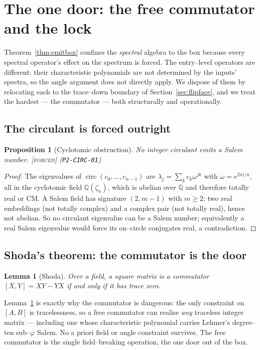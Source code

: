 \documentclass[11pt]{article}
\theoremstyle{plain}
\newtheorem{proposition}[theorem]{Proposition}
\newtheorem{lemma}[theorem]{Lemma}
\theoremstyle{definition}
\theoremstyle{remark}
\newcommand{\forced}{\textcolor{forcedc}{\textsc{[forced]}}}
\newcommand{\Q}{\mathbb{Q}}
\begin{document}
\section{The one door: the free commutator and the lock}\label{sec:door}

Theorem~\ref{thm:emitbox} confines the \emph{spectral} algebra to the box because every spectral operator's effect on the spectrum is forced. The entry--level operators are different: their characteristic polynomials are not determined by the inputs' spectra, so the angle argument does not directly apply. We dispose of them by relocating each to the trace--down boundary of Section~\ref{sec:flipface}, and we treat the hardest --- the commutator --- both structurally and operationally.

\subsection{The circulant is forced outright}
\begin{proposition}[Cyclotomic obstruction]\label{prop:circ}
No integer circulant emits a Salem number. \forced{} {\small(\texttt{P2-CIRC-01})}
\end{proposition}
\begin{proof}
The eigenvalues of $\operatorname{circ}(c_0,\dots,c_{n-1})$ are $\lambda_j=\sum_k c_k\omega^{jk}$ with $\omega=e^{2\pi i/n}$, all in the cyclotomic field $\Q(\zeta_n)$, which is abelian over $\Q$ and therefore totally real or CM. A Salem field has signature $(2,m-1)$ with $m\ge2$: two real embeddings (not totally complex) and a complex pair (not totally real), hence not abelian. So no circulant eigenvalue can be a Salem number; equivalently a real Salem eigenvalue would force its on--circle conjugates real, a contradiction.
\end{proof}

\subsection{Shoda's theorem: the commutator is the door}
\begin{lemma}[Shoda]\label{lem:shoda}
Over a field, a square matrix is a commutator $[X,Y]=XY-YX$ if and only if it has trace zero.
\end{lemma}

Lemma~\ref{lem:shoda} is exactly why the commutator is dangerous: the only constraint on $[A,B]$ is tracelessness, so a free commutator can realise \emph{any} traceless integer matrix --- including one whose characteristic polynomial carries Lehmer's degree--ten sub--$\varphi$ Salem. No a priori field or angle constraint survives. The free commutator is the single field--breaking operation, the one door out of the box.
\end{document}

